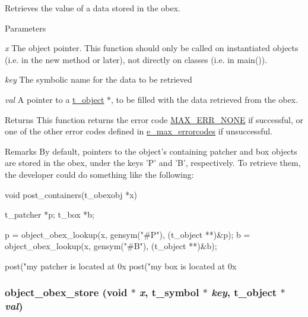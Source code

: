 Retrieves the value of a data stored in the obex. 
\begin{DoxyParams}{Parameters}
\item[{\em x}]The object pointer. This function should only be called on instantiated objects (i.e. in the {\ttfamily new} method or later), not directly on classes (i.e. in {\ttfamily main()}). \item[{\em key}]The symbolic name for the data to be retrieved \item[{\em val}]A pointer to a \hyperlink{structt__object}{t\_\-object} $\ast$, to be filled with the data retrieved from the obex.\end{DoxyParams}
\begin{DoxyReturn}{Returns}
This function returns the error code \hyperlink{group__misc_gga0764dd6c02b76cca7d053ae50555d69da6d22f77fef8b1e1b074cef5d29d935fd}{MAX\_\-ERR\_\-NONE} if successful, or one of the other error codes defined in \hyperlink{group__misc_ga0764dd6c02b76cca7d053ae50555d69d}{e\_\-max\_\-errorcodes} if unsuccessful.
\end{DoxyReturn}
\begin{DoxyRemark}{Remarks}
By default, pointers to the object's containing patcher and box objects are stored in the obex, under the keys 'P' and 'B', respectively. To retrieve them, the developer could do something like the following: 
\begin{DoxyCode}
    void post_containers(t_obexobj *x)
    {
        t_patcher *p;
        t_box *b;

        p = object_obex_lookup(x, gensym("#P"), (t_object **)&p);
        b = object_obex_lookup(x, gensym("#B"), (t_object **)&b);

        post("my patcher is located at 0x%
        post("my box is located at 0x%
    }
\end{DoxyCode}
 
\end{DoxyRemark}
\hypertarget{group__obj_gaccdb93572405a2e9f065086f9c3dfe41}{
\subsubsection[{object\_\-obex\_\-store}]{ object\_\-obex\_\-store (void $\ast$ {\em x}, \/  {\bf t\_\-symbol} $\ast$ {\em key}, \/  {\bf t\_\-object} $\ast$ {\em val})}}
\label{group__obj_gaccdb93572405a2e9f065086f9c3dfe41}


